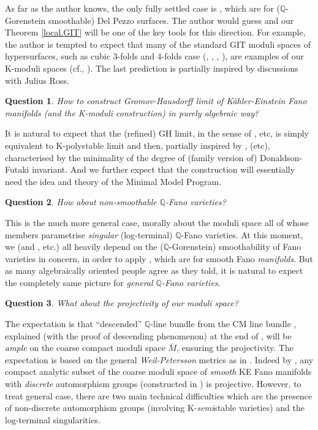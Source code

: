 \documentclass[12pt]{amsart}
\newtheorem{Ques}{Question}
\theoremstyle{remark}
\theoremstyle{definition}
\begin{document}
As far as the author knows, the only fully settled case is \cite{MM},\cite{OSS} 
which are for ($\mathbb{Q}$-Gorenstein smoothable) Del Pezzo surfaces. 
The author would guess \cite[Lemma 3.6]{OSS} and our Theorem \ref{local.GIT} 
will be one of the key tools for this 
direction. For example, the author is tempted to expect 
that many of the standard GIT 
moduli spaces of hypersurfaces, such as cubic $3$-folds and 
$4$-folds case (\cite{All}, \cite{Laza}, \cite{Yok1}, \cite{Yok2}), 
are examples of our K-moduli spaces 
(cf., \cite[Theorem 3.4 and subsection 4.2]{OSS}). The last prediction is 
partially inspired by discussions with Julius Ross. 

\begin{Ques}\label{Q2}
How to construct Gromov-Hausdorff limit of K\"ahler-Einstein Fano manifolds 
(and the K-moduli construction) in purely \textit{algebraic} way? 
\end{Ques}

It is natural to expect that the (refined) GH limit, in the sense of \cite{DS},\cite{OSS} etc, 
is simply equivalent to K-polystable 
limit and then, partially inspired by \cite{LX}, \cite[last section]{Od2} (etc), 
characterised by the minimality of 
the degree of (family version of) Donaldson-Futaki invariant. 
And we further expect that the construction 
will essentially need the idea and theory of the Minimal Model Program. 

\begin{Ques}\label{Q3}
How about \textit{non-smoothable} $\mathbb{Q}$-Fano varieties? 
\end{Ques}

This is the much more general case, 
morally about the moduli space all of whose members parametrise 
\textit{singular} (log-terminal) $\mathbb{Q}$-Fano varieties. 
At this moment, we (and \cite{SSY},\cite{LWX} etc.) all heavily depend on 
the ($\mathbb{Q}$-Gorenstein) smoothability of Fano varieties in concern, 
in order to apply \cite{CDS}, \cite{Tia2} which are for smooth Fano 
\textit{manifolds}. 
But as many algebraically oriented people agree as 
they told, it is natural to expect the completely same picture for 
\textit{general $\mathbb{Q}$-Fano varieties}. 

\begin{Ques}\label{Q4}
What about the \textit{projectivity} of our moduli space? 
\end{Ques}

The expectation is that ``descended'' $\mathbb{Q}$-line bundle from the CM line 
bundle \cite{FS}, \cite{PT} 
explained (with the proof of descending phenomenon) 
at the end of \cite{OSS}, will be \textit{ample} on the coarse compact 
moduli space $\bar{M}$, ensuring the projectivity. 
The expectation is based on the general 
\textit{Weil-Petersson} metrics as in \cite{FS}. Indeed by \cite{FS}, 
any compact analytic subset of the coarse moduli space of 
\textit{smooth} KE Fano manifolds with \textit{discrete} automorphism groups 
(constructed in \cite{Od2}) is projective. 
However, to treat general case, there are two main 
technical difficulties which are 
the presence of non-discrete automorphism groups 
(involving K-\textit{semi}stable varieties) and the log-terminal singularities. 
\end{document}
